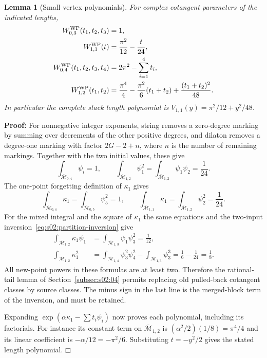 \documentclass[a4paper,10pt]{article}
\numberwithin{equation}{section}
\newcommand{\MM}{\overline{\mathcal{M}}}
\theoremstyle{paperplain}
\newtheorem{lmm}[thm]{Lemma}
\theoremstyle{paperremark}
\theoremstyle{paperplain}
\newenvironment{prf}{\noindent \textbf{Proof: }}{\hfill $\mdlgwhtsquare$\par\addvspace{0.5\baselineskip}}
\begin{document}
\begin{lmm}[Small vertex polynomials]\label{lmm:a:small-vertices}
For complex cotangent parameters of the indicated lengths,
\begin{align}
 W^{\rm WP}_{0,3}(t_1,t_2,t_3)&=1,\notag\\
 W^{\rm WP}_{1,1}(t)&=\frac{\pi^2}{12}-\frac{t}{24},\notag\\
 W^{\rm WP}_{0,4}(t_1,t_2,t_3,t_4)&=2\pi^2-\sum_{i=1}^4t_i,\notag\\
 W^{\rm WP}_{1,2}(t_1,t_2)&=\frac{\pi^4}{4}
       -\frac{\pi^2}{6}(t_1+t_2)+\frac{(t_1+t_2)^2}{48}.
 \label{eq:a:small-vertices}
\end{align}
In particular the complete stack length polynomial is
$V_{1,1}(y)=\pi^2/12+y^2/48$.
\end{lmm}
\begin{prf}
For nonnegative integer exponents, string removes a zero-degree marking
by summing over decrements of the other positive degrees, and dilaton
removes a degree-one marking with factor $2G-2+n$, where $n$ is the
number of remaining markings. Together with the two initial values,
these give
\[
 \int_{\MM_{0,4}}\psi_i=1,\qquad
 \int_{\MM_{1,2}}\psi_1^2
 =\int_{\MM_{1,2}}\psi_1\psi_2=\frac1{24}.
\]
The one-point forgetting definition of $\kappa_1$ gives
\[
 \int_{\MM_{0,4}}\kappa_1
       =\int_{\MM_{0,5}}\psi_5^2=1,\qquad
 \int_{\MM_{1,1}}\kappa_1
       =\int_{\MM_{1,2}}\psi_2^2=\frac1{24}.
\]
For the mixed integral and the square of $\kappa_1$ the same equations
and the two-input inversion~\eqref{eq:s02:partition-inversion} give
\begin{align*}
 \int_{\MM_{1,2}}\kappa_1\psi_1
  &=\int_{\MM_{1,3}}\psi_1\psi_3^2=\frac1{12},\\
 \int_{\MM_{1,2}}\kappa_1^2
  &=\int_{\MM_{1,4}}\psi_3^2\psi_4^2
                -\int_{\MM_{1,3}}\psi_3^3
    =\frac16-\frac1{24}=\frac18.
\end{align*}
All new-point powers in these formulas are at least two. Therefore the
rational-tail lemma of Section~\ref{subsec:s02:04} permits replacing
old pulled-back cotangent classes by source classes. The minus sign
in the last line is the merged-block term of the inversion, and must
be retained.

Expanding $\exp(\alpha\kappa_1-\sum t_i\psi_i)$ now proves each
polynomial, including its factorials. For instance its constant term
on $\MM_{1,2}$ is $(\alpha^2/2)(1/8)=\pi^4/4$ and its linear
coefficient is $-\alpha/12=-\pi^2/6$.
Substituting $t=-y^2/2$ gives the stated length polynomial.
\end{prf}
\end{document}
